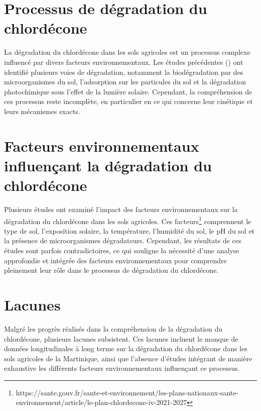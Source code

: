 \documentclass{report}
\begin{document}
\section*{Processus de dégradation du chlordécone}


La dégradation du chlordécone dans les sols agricoles est un processus complexe influencé par divers facteurs environnementaux. Les études précédentes (\cite{coulis2023contamination}) ont identifié plusieurs voies de dégradation, notamment la biodégradation par des microorganismes du sol, l'adsorption sur les particules du sol et la dégradation photochimique sous l'effet de la lumière solaire. Cependant, la compréhension de ces processus reste incomplète, en particulier en ce qui concerne leur cinétique et leurs mécanismes exacts.\\


\section*{Facteurs environnementaux influençant la dégradation du chlordécone}

Plusieurs études ont examiné l'impact des facteurs environnementaux sur la dégradation du chlordécone dans les sols agricoles. Ces facteurs\footnote{https://sante.gouv.fr/sante-et-environnement/les-plans-nationaux-sante-environnement/article/le-plan-chlordecone-iv-2021-2027} comprennent le type de sol, l'exposition solaire, la température, l'humidité du sol, le pH du sol et la présence de microorganismes dégradateurs. Cependant, les résultats de ces études sont parfois contradictoires, ce qui souligne la nécessité d'une analyse approfondie et intégrée des facteurs environnementaux pour comprendre pleinement leur rôle dans le processus de dégradation du chlordécone.\\


\section*{Lacunes}

Malgré les progrès réalisés dans la compréhension de la dégradation du chlordécone, plusieurs lacunes subsistent. Ces lacunes incluent le manque de données longitudinales à long terme sur la dégradation du chlordécone dans les sols agricoles de la Martinique, ainsi que l'absence d'études intégrant de manière exhaustive les différents facteurs environnementaux influençant ce processus.
\\
\end{document}
